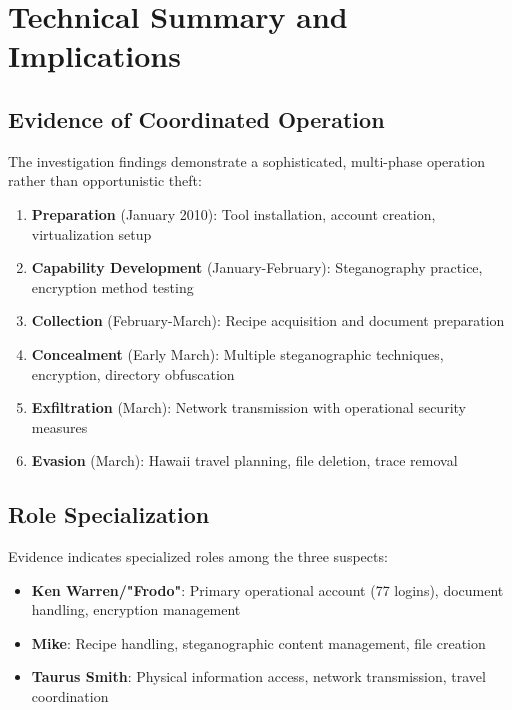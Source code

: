 \section{Technical Summary and Implications}

\subsection{Evidence of Coordinated Operation}
The investigation findings demonstrate a sophisticated, multi-phase operation rather than opportunistic theft:

\begin{enumerate}
    \item \textbf{Preparation} (January 2010): Tool installation, account creation, virtualization setup
    \item \textbf{Capability Development} (January-February): Steganography practice, encryption method testing
    \item \textbf{Collection} (February-March): Recipe acquisition and document preparation
    \item \textbf{Concealment} (Early March): Multiple steganographic techniques, encryption, directory obfuscation
    \item \textbf{Exfiltration} (March): Network transmission with operational security measures
    \item \textbf{Evasion} (March): Hawaii travel planning, file deletion, trace removal
\end{enumerate}

\subsection{Role Specialization}
Evidence indicates specialized roles among the three suspects:
\begin{itemize}
    \item \textbf{Ken Warren/"Frodo"}: Primary operational account (77 logins), document handling, encryption management
    \item \textbf{Mike}: Recipe handling, steganographic content management, file creation
    \item \textbf{Taurus Smith}: Physical information access, network transmission, travel coordination
\end{itemize}

